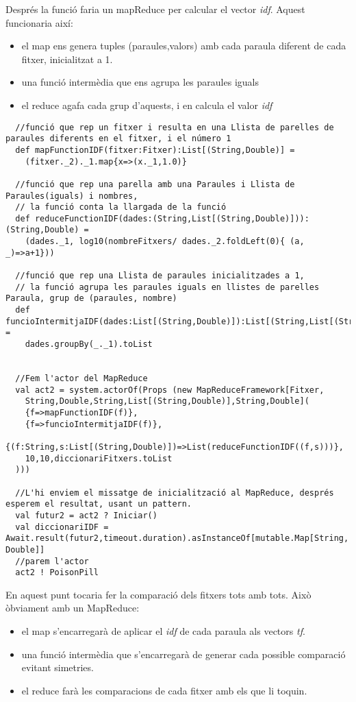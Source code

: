 \documentclass[11pt,a4paper,twoside]{report}
\begin{document}
Després la funció faria un mapReduce per calcular el vector \textit{idf}. Aquest funcionaria així:

\begin{itemize}
  \item el map ens genera tuples (paraules,valors) amb cada paraula diferent de cada fitxer, inicialitzat a 1.
  \item una funció intermèdia que ens agrupa les paraules iguals
  \item el reduce agafa cada grup d'aquests, i en calcula el valor \textit{idf}
\end{itemize}

\begin{lstlisting}
  //funció que rep un fitxer i resulta en una Llista de parelles de paraules diferents en el fitxer, i el número 1
  def mapFunctionIDF(fitxer:Fitxer):List[(String,Double)] =
    (fitxer._2)._1.map{x=>(x._1,1.0)}

  //funció que rep una parella amb una Paraules i Llista de Paraules(iguals) i nombres,
  // la funció conta la llargada de la funció
  def reduceFunctionIDF(dades:(String,List[(String,Double)])):(String,Double) =
    (dades._1, log10(nombreFitxers/ dades._2.foldLeft(0){ (a, _)=>a+1}))

  //funció que rep una Llista de paraules inicialitzades a 1,
  // la funció agrupa les paraules iguals en llistes de parelles Paraula, grup de (paraules, nombre)
  def funcioIntermitjaIDF(dades:List[(String,Double)]):List[(String,List[(String,Double)])] =
    dades.groupBy(_._1).toList


  //Fem l'actor del MapReduce
  val act2 = system.actorOf(Props (new MapReduceFramework[Fitxer,
    String,Double,String,List[(String,Double)],String,Double](
    {f=>mapFunctionIDF(f)},
    {f=>funcioIntermitjaIDF(f)},
    {(f:String,s:List[(String,Double)])=>List(reduceFunctionIDF((f,s)))},
    10,10,diccionariFitxers.toList
  )))

  //L'hi enviem el missatge de inicialització al MapReduce, després esperem el resultat, usant un pattern.
  val futur2 = act2 ? Iniciar()
  val diccionariIDF = Await.result(futur2,timeout.duration).asInstanceOf[mutable.Map[String, Double]]
  //parem l'actor
  act2 ! PoisonPill
\end{lstlisting}

En aquest punt tocaria fer la comparació dels fitxers tots amb tots. Això òbviament amb un MapReduce:
\begin{itemize}
  \item el map s'encarregarà de aplicar el \textit{idf} de cada paraula als vectors \textit{tf}.
  \item una funció intermèdia que s'encarregarà de generar cada possible comparació evitant simetries.
  \item el reduce farà les comparacions de cada fitxer amb els que li toquin.
\end{itemize}
\end{document}
